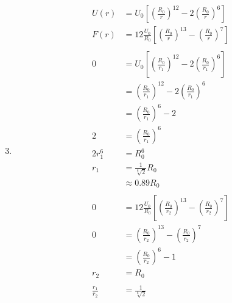 \documentclass{article}
\begin{document}
\begin{enumerate}
  \setcounter{enumi}{2}
  \item

        \begin{align*}
          U(r)            & = U_0 \left[ \left( \frac{R_0}{r} \right)^{12} - 2 \left( \frac{R_0}{r} \right)^6 \right]                  \\
          F(r)            & = 12 \frac{U_0}{R_0} \left[ \left( \frac{R_0}{r} \right)^{13} - \left( \frac{R_0}{r} \right)^7 \right]     \\ \\
          0               & = U_0 \left[ \left( \frac{R_0}{r_1} \right)^{12} - 2 \left( \frac{R_0}{r_1} \right)^6 \right]              \\
                          & = \left( \frac{R_0}{r_1} \right)^{12} - 2 \left( \frac{R_0}{r_1} \right)^6                                 \\
                          & = \left( \frac{R_0}{r_1} \right)^6 - 2                                                                     \\
          2               & = \left( \frac{R_0}{r_1} \right)^6                                                                         \\
          2 r_1^6         & = R_0^6                                                                                                    \\
          r_1             & = \frac{1}{\sqrt[6]{2}} R_0                                                                                \\
                          & \approx 0.89 R_0                                                                                           \\ \\
          0               & = 12 \frac{U_0}{R_0} \left[ \left( \frac{R_0}{r_2} \right)^{13} - \left( \frac{R_0}{r_2} \right)^7 \right] \\
          0               & = \left( \frac{R_0}{r_2} \right)^{13} - \left( \frac{R_0}{r_2} \right)^7                                   \\
                          & = \left( \frac{R_0}{r_2} \right)^6 - 1                                                                     \\
          r_2             & = R_0                                                                                                      \\ \\
          \frac{r_1}{r_2} & = \frac{1}{\sqrt[6]{2}}
        \end{align*}


\end{enumerate}
\end{document}
